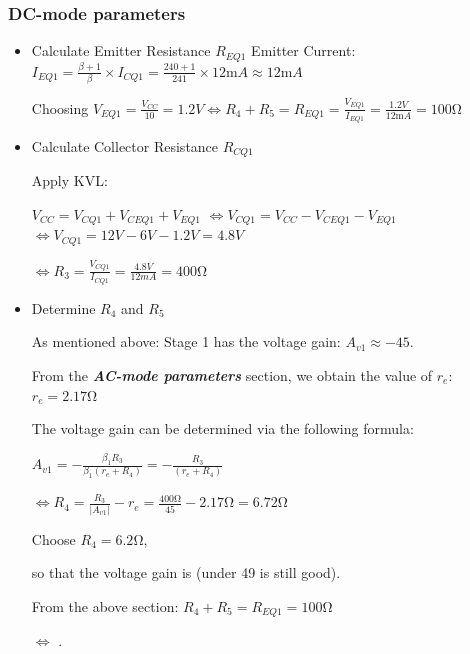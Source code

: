 \documentclass[twoside, a4paper, leqno]{article}
\begin{document}
		\subsubsection*{DC-mode parameters}
		\begin{itemize}
			\item Calculate Emitter Resistance $R_{EQ1}$
				Emitter Current: $I_{EQ1} = \frac{\beta+1}{\beta}\times I_{CQ1} = \frac{240+1}{241}\times12\si{\milli}A \approx 12\si{\milli}A$
			
				Choosing $V_{EQ1} = \frac{V_{CC}}{10} = 1.2V \Leftrightarrow R_4 + R_5 = R_{EQ1} = \frac{V_{EQ1}}{I_{EQ1}} = \frac{1.2V}{12\si{\milli}A} = 100\si{\ohm}$
				
				
			\item Calculate Collector Resistance $R_{CQ1}$
			
				Apply KVL:
				
				$V_{CC} = V_{CQ1} + V_{CEQ1} + V_{EQ1}$
				$\Leftrightarrow V_{CQ1} = V_{CC} - V_{CEQ1} - V_{EQ1}$
				$\Leftrightarrow V_{CQ1} = 12V - 6V - 1.2V = 4.8V$
				
				$\Leftrightarrow R_3 = \frac{V_{CQ1}}{I_{CQ1}} = \frac{4.8V}{12mA} = 400\si{\ohm}$
				
				
			\item Determine $R_4$ and $R_5$
			
				As mentioned above: Stage 1 has the voltage gain: $A_{v1} \approx -45$.
				
				From the \textbf{\textit{AC-mode parameters}} section, we obtain the value of $r_e$: $r_e = 2.17\si{\ohm}$
				
				The voltage gain can be determined via the following formula:
				
				$A_{v1} = -\frac{\beta_1R_3}{\beta_1(r_e+R_4)} = -\frac{R_3}{(r_e+R_4)}$
				
				$\Leftrightarrow R_4 = \frac{R_3}{|A_{v1}|} - r_e = \frac{400\si{\ohm}}{45} - 2.17\si{\ohm} = 6.72\si{\ohm}$
				
				Choose $R_4 = 6.2\si{\ohm}$,
				
				so that the voltage gain is  (under 49 is still good).
				
				From the above section: $R_4 + R_5 = R_{EQ1} = 100\si{\ohm}$
				
				$\Leftrightarrow$ .
				

\end{itemize}
\end{document}
